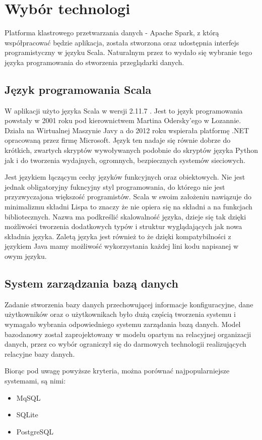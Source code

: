 \documentclass[a4paper,12pt,twoside]{article}
\begin{document}
\newpage
\section{Wybór technologi}

Platforma klastrowego przetwarzania danych - Apache Spark\cite{spark}, z którą współpracować będzie aplikacja, została stworzona oraz udostępnia interfejs programistyczny w języku Scala.
Naturalnym przez to wydało się wybranie tego języka programowania do stworzenia przeglądarki danych.

  
\subsection{Język programowania Scala}
W aplikacji użyto języka Scala w wersji 2.11.7 \cite{jezykScala}. Jest to język programowania powstały w 2001 roku pod kierownictwem Martina Odersky'ego w Lozannie.
Działa na Wirtualnej Maszynie Javy a do 2012 roku wspierała platformę .NET opracowaną przez firmę Microsoft. Język ten nadaje się równie dobrze do krótkich, zwartych skryptów  wywoływanych podobnie do skryptów języka Python jak i do tworzenia wydajnych, ogromnych, bezpiecznych systemów sieciowych.

Jest językiem łączącym cechy języków funkcyjnych oraz obiektowych. 
Nie jest jednak obligatoryjny fukncyjny styl programowania, do którego nie jest przyzwyczajona większość programistów.
 Scala w swoim założeniu nawiązuje do minimalizmu składni Lispa to znaczy że nie opiera się na składni a na funkcjach bibliotecznych. Nazwa ma podkreślić skalowalność języka, dzieje się tak dzięki możliwości tworzenia dodatkowych typów i struktur wyglądających jak nowa składnia języka.
Zaletą języka jest również to że dzięki kompatybilności z językiem Java mamy możliwość wykorzystania każdej lini kodu napisanej w owym języku.

\subsection{System zarządzania bazą danych}  
Zadanie stworzenia bazy danych przechowującej informacje konfiguracyjne, dane użytkowników oraz o użytkownikach było 
dużą częścią tworzenia systemu i
wymagało wybrania odpowiedniego systemu zarządania bazą danych.
Model bazodanowy został zaprojektowany w modelu opartym na relacyjnej organizacji danych, przez co wybór ograniczył się do
darmowych technologii realizujących relacyjne bazy danych.

\newpage
Biorąc pod uwagę powyższe kryteria, można porównać najpopularniejsze systemami, są nimi\cite{porownanieBaz}: 
 \begin{itemize}
  \item MqSQL
  \item SQLite
  \item PostgreSQL
\end{itemize}
\end{document}
